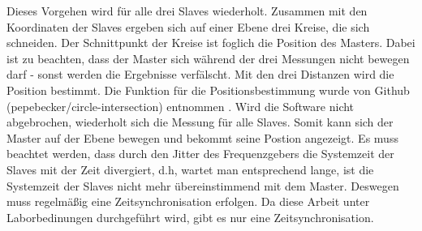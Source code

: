 Dieses Vorgehen wird für alle drei Slaves wiederholt. Zusammen mit den Koordinaten der Slaves ergeben sich auf einer Ebene drei Kreise, die sich schneiden. Der Schnittpunkt der Kreise ist foglich die Position des Masters. Dabei ist zu beachten, dass der Master sich während der drei Messungen nicht bewegen darf - sonst werden die Ergebnisse verfälscht. Mit den drei Distanzen wird die Position bestimmt. Die Funktion für die Positionsbestimmung wurde von Github (pepebecker/circle-intersection) entnommen \cite{src_GITHUB_CODE}. Wird die Software nicht abgebrochen, wiederholt sich die Messung für alle Slaves. Somit kann sich der Master auf der Ebene bewegen und bekommt seine Postion angezeigt. Es muss beachtet werden, dass durch den Jitter des Frequenzgebers die Systemzeit der Slaves mit der Zeit divergiert, d.h, wartet man entsprechend lange, ist die Systemzeit der Slaves nicht mehr übereinstimmend mit dem Master. Deswegen muss regelmäßig eine Zeitsynchronisation erfolgen. Da diese Arbeit unter Laborbedinungen durchgeführt wird, gibt es nur eine Zeitsynchronisation.

